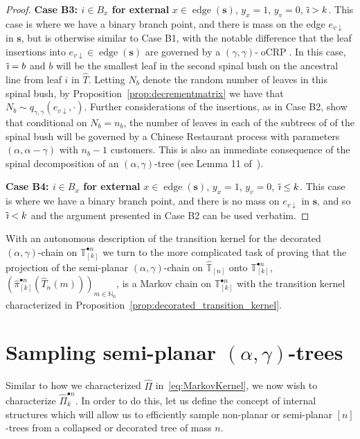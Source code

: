 \documentclass[a4paper, final]{amsart}
\theoremstyle{plain}
\theoremstyle{definition}
\newcommand{\tree}[1][t]{\boldsymbol{#1}}
\newcommand{\That}[1][T]{\widehat{#1}}
\newcommand{\Thatspace}[1][\T]{\widehat{\boldsymbol{#1}}} %
\newcommand{\T}{\mathbb{T}}
\DeclareMathOperator{\edge}{edge}
\DeclareMathOperator{\tildei}{\tilde{\textit{\i}}}
\DeclareMathOperator{\ocrp}{oCRP}
\newcommand{\N}{\mathbb{N}}
\begin{document}
\begin{proof}
  \textbf{Case B3: $i \in B_x$ for external} $x \in \edge (\tree[s])$, $y_x = 1$, $y_v = 0$, $\tildei > k$.
  This case is where we have a binary branch point, and there is mass on the edge $e_{v\downarrow}$ in $\tree[s]$, but is otherwise similar to Case B1, with the notable difference that the leaf insertions into $e_{v\downarrow} \in \edge (\tree[s])$ are governed by a $(\gamma, \gamma)$-$\ocrp$.
  In this case, $\tildei = b$ and $b$ will be the smallest leaf in the second spinal bush on the ancestral line from leaf $i$ in $\That$.
  Letting $N_b$ denote the random number of leaves in this spinal bush, by Proposition~\ref{prop:decrementmatrix} we have that $N_b \sim q_{\gamma,\gamma}(e_{v\downarrow}, \cdot)$.
  Further considerations of the insertions, as in Case B2, show that conditional on $N_b = n_b$, the number of leaves in each of the subtrees of of the spinal bush will be governed by a Chinese Restaurant process with parameters $(\alpha, \alpha-\gamma)$ with $n_b - 1$ customers.
  This is also an immediate consequence of the spinal decomposition of an $(\alpha, \gamma)$-tree (see Lemma 11 of~\cite{RefWorks:doc:5b4cbb5fe4b02dc0c79270af}). 
  
\textbf{Case B4: $i \in B_x$ for external} $x \in \edge (\tree[s])$, $y_x = 1$, $y_v = 0$, $\tildei \leq k$.
  This case is where we have a binary branch point, and there is no mass on $e_{v\downarrow}$ in $\tree[s]$, and so $\tildei < k$ and the argument presented in Case B2 can be used verbatim.
\end{proof}
%
With an autonomous description of the transition kernel for the decorated $(\alpha, \gamma)$-chain on $\T_{[k]}^{\bullet n}$ we turn to the more complicated task of proving that the projection of the semi-planar $(\alpha, \gamma)$-chain on $\Thatspace_{[n]}$ onto $\T_{[k]}^{\bullet n}$, ${\left( \hat{\pi}_{[k]}^{\bullet n} \left( \That_n(m) \right) \right)}_{m \in \N_0}$, is a Markov chain on $\T_{[k]}^{\bullet n}$ with the transition kernel characterized in Proposition~\ref{prop:decorated_transition_kernel}.

\section{Sampling semi-planar $(\alpha, \gamma)$-trees}
%
Similar to how we characterized $\hat{\Pi}$ in~\eqref{eq:MarkovKernel}, we now wish to characterize $\hat{\Pi}_k^{\bullet n}$.
In order to do this, let us define the concept of internal structures which will allow us to efficiently sample non-planar or semi-planar $[n]$-trees from a collapsed or decorated tree of mass $n$.
\end{document}
